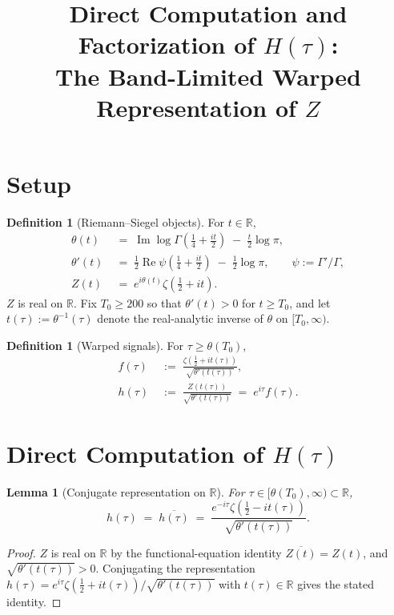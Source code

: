\documentclass[11pt]{article}
\title{Direct Computation and Factorization of $H(\tau)$:\\
       The Band-Limited Warped Representation of $Z$}
\author{}
\date{}
\newtheorem{lemma}[theorem]{Lemma}
\theoremstyle{definition}
\newtheorem{definition}[theorem]{Definition}
\DeclareMathOperator{\Real}{Re}
\DeclareMathOperator{\Imag}{Im}
\begin{document}
\maketitle

\section{Setup}

\begin{definition}[Riemann--Siegel objects]
For $t \in \mathbb{R}$,
\begin{align}
\theta(t) &\;=\; \Imag\log\Gamma\!\left(\tfrac{1}{4}+\tfrac{it}{2}\right) \;-\; \tfrac{t}{2}\log\pi, \\
\theta'(t) &\;=\; \tfrac{1}{2}\Real\psi\!\left(\tfrac{1}{4}+\tfrac{it}{2}\right) \;-\; \tfrac{1}{2}\log\pi, \qquad \psi := \Gamma'/\Gamma, \\
Z(t) &\;=\; e^{i\theta(t)}\zeta\!\left(\tfrac{1}{2}+it\right).
\end{align}
$Z$ is real on $\mathbb{R}$. Fix $T_0 \ge 200$ so that $\theta'(t) > 0$ for $t \ge T_0$, and let $t(\tau) := \theta^{-1}(\tau)$ denote the real-analytic inverse of $\theta$ on $[T_0, \infty)$.
\end{definition}

\begin{definition}[Warped signals]
For $\tau \ge \theta(T_0)$,
\begin{align}
f(\tau) &\;:=\; \frac{\zeta(\tfrac12 + it(\tau))}{\sqrt{\theta'(t(\tau))}}, \\
h(\tau) &\;:=\; \frac{Z(t(\tau))}{\sqrt{\theta'(t(\tau))}} \;=\; e^{i\tau}f(\tau).
\end{align}
\end{definition}

\section{Direct Computation of $H(\tau)$}

\begin{lemma}[Conjugate representation on $\mathbb{R}$]\label{lem:conj}
For $\tau \in [\theta(T_0), \infty) \subset \mathbb{R}$,
\[
h(\tau) \;=\; \overline{h(\tau)} \;=\; \frac{e^{-i\tau}\zeta(\tfrac12 - it(\tau))}{\sqrt{\theta'(t(\tau))}}.
\]
\end{lemma}

\begin{proof}
$Z$ is real on $\mathbb{R}$ by the functional-equation identity $\overline{Z(t)} = Z(t)$, and $\sqrt{\theta'(t(\tau))} > 0$. Conjugating the representation $h(\tau) = e^{i\tau}\zeta(\tfrac12+it(\tau))/\sqrt{\theta'(t(\tau))}$ with $t(\tau) \in \mathbb{R}$ gives the stated identity.
\end{proof}
\end{document}
